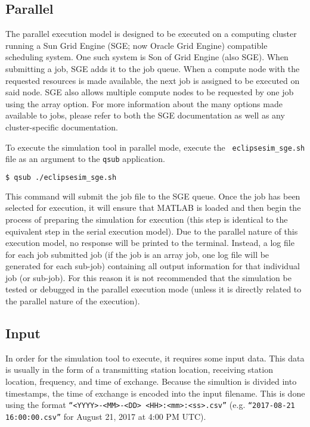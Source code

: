 \documentclass[12pt,letterpaper]{article}
\begin{document}
\subsection{Parallel}
\label{sec:usage:parallel}

The parallel execution model is designed to be executed on a computing cluster
running a Sun Grid Engine (SGE; now Oracle Grid Engine) compatible scheduling
system. One such system is Son of Grid Engine (also SGE). When submitting a job,
SGE adds it to the job queue. When a compute node with the requested resources
is made available, the next job is assigned to be executed on said node. SGE
also allows multiple compute nodes to be requested by one job using the array
option. For more information about the many options made available to jobs,
please refer to both the SGE documentation as well as any cluster-specific
documentation.

To execute the simulation tool in parallel mode, execute the {\tt
  eclipsesim\_sge.sh} file as an argument to the {\tt qsub} application.

\begin{lstlisting}[language=bash]
  $ qsub ./eclipsesim_sge.sh
\end{lstlisting}

This command will submit the job file to the SGE queue. Once the job has been
selected for execution, it will ensure that MATLAB is loaded and then begin the
process of preparing the simulation for execution (this step is identical to the
equivalent step in the serial execution model). Due to the parallel nature of
this execution model, no response will be printed to the terminal. Instead, a
log file for each job submitted job (if the job is an array job, one log file
will be generated for each sub-job) containing all output information for that
individual job (or sub-job). For this reason it is not recommended that the
simulation be tested or debugged in the parallel execution mode (unless it is
directly related to the parallel nature of the execution).

\subsection{Input}
\label{sec:usage:input}

In order for the simulation tool to execute, it requires some input data. This
data is usually in the form of a transmitting station location, receiving
station location, frequency, and time of exchange. Because the simultion is
divided into timestamps, the time of exchange is encoded into the input
filename. This is done using the format {\tt ``<YYYY>-<MM>-<DD>
  <HH>:<mm>:<ss>.csv''} (e.g. {\tt ``2017-08-21 16:00:00.csv''} for August 21,
2017 at 4:00 PM UTC).
\end{document}
